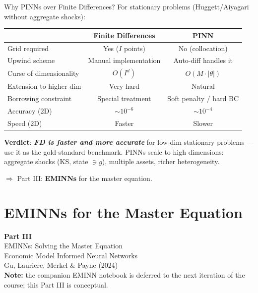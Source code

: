 \documentclass[aspectratio=169,11pt]{beamer}
\newcommand{\emphc}[1]{\textcolor{harvardcrimson}{#1}}
\begin{document}
\begin{frame}{Why PINNs over Finite Differences?}
\small
For stationary problems (Huggett/Aiyagari without aggregate shocks):

\vspace{0.1em}
\begin{center}
\footnotesize
\renewcommand{\arraystretch}{1.05}
\begin{tabular}{lcc}
\toprule
& \textbf{Finite Differences} & \textbf{PINN} \\
\midrule
Grid required & Yes ($I$ points) & \emphc{No} (collocation) \\
Upwind scheme & Manual implementation & Auto-diff handles it \\
Curse of dimensionality & $O(I^d)$ & $O(M \cdot |\theta|)$ \\
Extension to higher dim & Very hard & Natural \\
Borrowing constraint & Special treatment & Soft penalty / hard BC \\
Accuracy (2D) & $\sim 10^{-6}$ & $\sim 10^{-4}$ \\
Speed (2D) & Faster & Slower \\
\bottomrule
\end{tabular}
\end{center}

\vspace{0.1em}
\textbf{Verdict}: \textbf{\emph{FD is faster and more accurate}} for low-dim stationary problems --- use it as the gold-standard benchmark. PINNs \emphc{scale to high dimensions}: aggregate shocks (KS, state $\ni g$), multiple assets, richer heterogeneity.
\vspace{-0.2em}

$\Longrightarrow$ Part III: \textbf{EMINNs} for the master equation.
\end{frame}


\section{EMINNs for the Master Equation}

\begin{frame}{}
\vfill
\begin{center}
{\Huge \textcolor{uzhblue}{\textbf{Part III}}}\\[12pt]
{\LARGE EMINNs: Solving the Master Equation}\\[6pt]
{\large Economic Model Informed Neural Networks}\\[6pt]
{\small Gu, Lauriere, Merkel \& Payne (2024)}\\[10pt]
{\footnotesize \textbf{Note:} the companion EMINN notebook is deferred to the next iteration of the course; this Part III is conceptual.}
\end{center}
\vfill
\end{frame}
\end{document}
